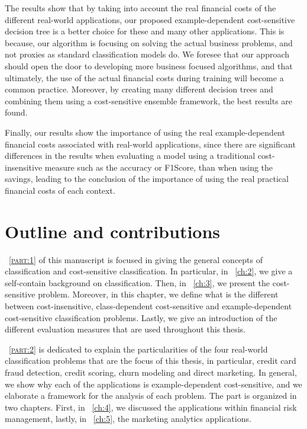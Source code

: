   The results show that by taking into account the real financial costs of the different 
  real-world applications, our  proposed example-dependent cost-sensitive decision tree is a better 
  choice for these and many other applications. This is because, our algorithm is focusing on 
  solving the actual business problems,  and not proxies as standard classification models do. We 
  foresee that our approach should open the door to developing more business focused algorithms, 
  and  that ultimately, the use of the actual financial costs during training will become a common 
  practice. Moreover, by creating many different decision trees and combining them using a 
  cost-sensitive ensemble framework, the best results are found.

  Finally, our results show the importance of using the real example-dependent financial costs 
  associated with real-world applications, since there are significant differences in the 
  results when evaluating a model using a traditional cost-insensitive measure such as the 
  accuracy or F1Score,  than when using the savings, leading to the conclusion of the 
  importance of using the real practical financial costs of each context.

\newpage
\section{Outline and contributions}

\partname{~\textsc{\ref{part:1}}} of this manuscript is focused in giving the general concepts of 
classification and cost-sensitive classification. In particular, in \chaptername{~\ref{ch:2}}, we 
give a self-contain background on classification. Then, in \chaptername{~\ref{ch:3}}, we present 
the cost-sensitive problem. Moreover, in this chapter, we define what is the different between 
cost-insensitive, class-dependent cost-sensitive and example-dependent cost-sensitive 
classification problems. Lastly, we give an introduction of the different evaluation measures 
that are used throughout this thesis.

\partname{~\textsc{\ref{part:2}}} is dedicated to explain the particularities of the four 
real-world classification problems that are the focus of this thesis, in particular, credit card 
fraud detection, credit scoring, churn modeling and direct marketing. In general, we show why each 
of the applications is example-dependent cost-sensitive, and we elaborate a framework for the 
analysis of each problem. The part is organized in two chapters. First, in 
\chaptername{~\ref{ch:4}}, we discussed the applications within financial risk management, lastly, 
in  \chaptername{~\ref{ch:5}}, the marketing analytics applications.


